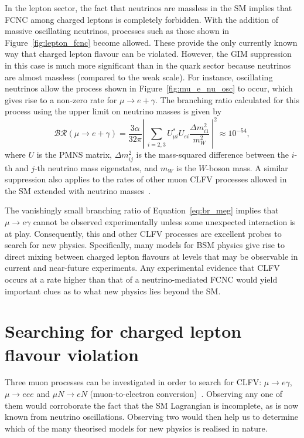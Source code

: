 In the lepton sector, the fact that neutrinos are massless in the SM implies
that FCNC among charged leptons is completely forbidden. With the addition of
massive oscillating neutrinos, processes such as those shown in
Figure~\ref{fig:lepton_fcnc} become allowed. These provide the only currently
known way that charged lepton flavour can be violated. However, the GIM
suppression in this case is much more significant than in the quark sector
because neutrinos are almost massless (compared to the weak scale). For
instance, oscillating neutrinos allow the process shown in
Figure~\ref{fig:mu_e_nu_osc} to occur, which gives rise to a non-zero rate for
${\mu \rightarrow e + \gamma}$. The branching ratio calculated for this process
using the upper limit on neutrino masses is given by~\cite{BERNSTEIN201327}
\begin{equation}\label{eq:br_meg}
\mathcal{BR}(\mu \rightarrow e + \gamma) = \frac{3\alpha}{32\pi} \left|\ \sum_{i=2, 3} U^*_{\mu i} U_{e i} 
\frac{\Delta m^2_{i1}}{m^2_W}  \ \right| ^2 \approx 10^{-54},
\end{equation}
where $U$ is the PMNS matrix, $\Delta m^2_{ij}$ is the mass-squared difference
between the $i$-th and $j$-th neutrino mass eigenstates, and $m_W$ is the
$W$-boson mass. 
A similar suppression also applies to the rates of other muon CLFV processes allowed in the
SM extended with neutrino masses~\cite{doi:10.1063/1.56214}.

The vanishingly small branching ratio of Equation~\ref{eq:br_meg} implies that
$\mu\rightarrow e\gamma$ cannot be observed experimentally unless some
unexpected interaction is at play. Consequently, this and other CLFV processes
are excellent probes to search for new physics. Specifically, many models for
BSM physics give rise to direct mixing between charged lepton flavours at levels
that may be observable in current and near-future experiments. Any experimental
evidence that CLFV occurs at a rate higher than that of a neutrino-mediated FCNC
would yield important clues as to what new physics lies beyond the SM.

\section{Searching for charged lepton flavour violation}\label{sec:clfv}

Three muon processes can be investigated in order to search for CLFV: ${\mu
\rightarrow e\gamma}$, ${\mu \rightarrow eee}$ and ${\mu N \rightarrow e N}$
(muon-to-electron conversion)~\cite{BERNSTEIN201327}. Observing any one of them
would corroborate the fact that the SM Lagrangian is incomplete, as is now known
from neutrino oscillations. Observing two would then help us to determine which
of the many theorised models for new physics is realised in nature. 


